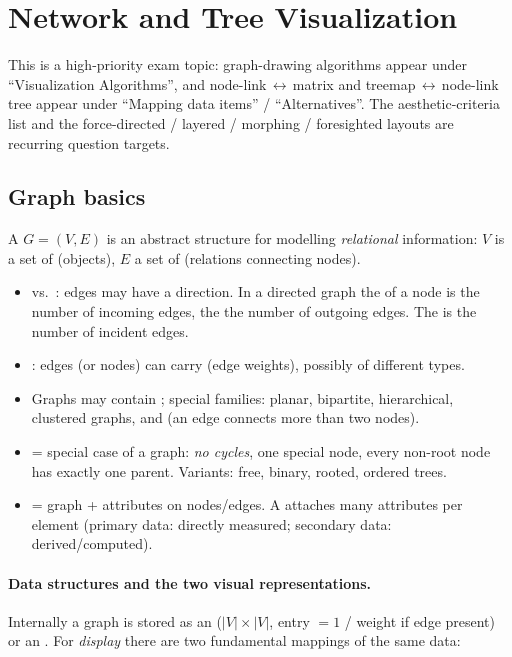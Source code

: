\section{Network and Tree Visualization}

This is a high-priority exam topic: graph-drawing algorithms appear under
``Visualization Algorithms'', and node-link\,$\leftrightarrow$\,matrix and
treemap\,$\leftrightarrow$\,node-link tree appear under ``Mapping data items'' /
``Alternatives''. The aesthetic-criteria list and the force-directed / layered /
morphing / foresighted layouts are recurring question targets.

\subsection{Graph basics}

\begin{keybox}[Definitions]
A  $G=(V,E)$ is an abstract structure for modelling
\emph{relational} information: $V$ is a set of  (objects), $E$ a set
of  (relations connecting nodes).
\begin{itemize}
  \item {} vs.\ : edges may have a direction. In a
  directed graph the  of a node is the number of incoming edges,
  the  the number of outgoing edges. The  is the
  number of incident edges.
  \item {}: edges (or nodes) can carry  (edge weights),
  possibly of different types.
  \item Graphs may contain ; special families: planar, bipartite,
  hierarchical, clustered graphs, and  (an edge connects more
  than two nodes).
  \item {} = special case of a graph: \emph{no cycles}, one special
   node, every non-root node has exactly one parent. Variants: free,
  binary, rooted, ordered trees.
  \item {} = graph + attributes on nodes/edges. A
   attaches many attributes per element (primary data:
  directly measured; secondary data: derived/computed).
\end{itemize}
\end{keybox}

\paragraph{Data structures and the two visual representations.}
Internally a graph is stored as an  ($|V|\times|V|$, entry
$=1$ / weight if edge present) or an . For \emph{display}
there are two fundamental mappings of the same data:


